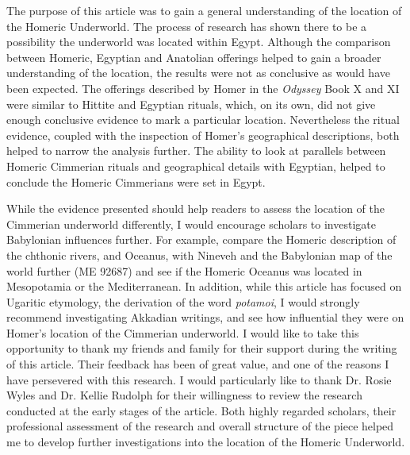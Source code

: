 	
	The purpose of this article was to gain a general understanding of the location of the Homeric Underworld.  The process of research has shown there to be a possibility the underworld was located within Egypt. Although the comparison between Homeric, Egyptian and Anatolian offerings helped to gain a broader understanding of the location, the results were not as conclusive as would have been expected. The offerings described by Homer in the \emph{Odyssey} Book X and XI were similar to Hittite and Egyptian rituals, which, on its own, did not give enough conclusive evidence to mark a particular location. Nevertheless the ritual evidence, coupled with the inspection of Homer’s geographical descriptions, both helped to narrow the analysis further. The ability to look at parallels between Homeric Cimmerian rituals and geographical details with Egyptian, helped to conclude the Homeric Cimmerians were set in Egypt.
	
	While the evidence presented should help readers to assess the location of the Cimmerian underworld differently, I would encourage scholars to investigate Babylonian influences further. For example, compare the Homeric description of the chthonic rivers, and Oceanus, with Nineveh and the Babylonian map of the world further (ME 92687) and see if the Homeric Oceanus was located in Mesopotamia or the Mediterranean. In addition, while this article has focused on Ugaritic etymology, the derivation of the word \emph{potamoi}, I would strongly recommend investigating Akkadian writings, and see how influential they were on Homer’s location of the Cimmerian underworld. 
\myseparator	
I would like to take this opportunity to thank my friends and family for their support during the writing of this article. Their feedback has been of great value, and one of the reasons I have persevered with this research. I would particularly like to thank Dr. Rosie Wyles and Dr. Kellie Rudolph for their willingness to review the research conducted at the early stages of the article. Both highly regarded scholars, their professional assessment of the research and overall structure of the piece helped me to develop further investigations into the location of the Homeric Underworld.
			
			

